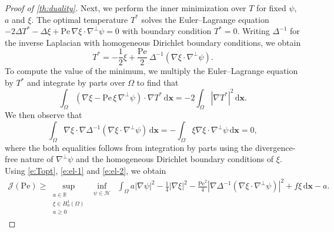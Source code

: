 \documentclass[10pt,a4paper]{amsart}
\newcommand{\Pe}{\mathrm{Pe}}
\newcommand{\R}{\mathbb{R}}
\newcommand{\abs}[1]{\left\vert #1 \right\vert}
\newcommand{\avg}[1]{\int_\Omega #1 \,\dx}
\newcommand{\cal}[1]{\mathcal{#1}}
\newcommand{\dx}{\mathrm{d} \vec{x}}
\newcommand{\invlap}{\Delta^{-1}}
\newcommand{\ocpval}{\mathcal{J}}
\renewcommand{\vec}[1]{\mathbf{#1}}
\begin{document}
\begin{proof}[Proof of \cref{th:duality}]
    Next, we perform the inner minimization over $T$ for fixed $\psi$, $a$ and $\xi$. The optimal temperature $T^*$ solves the Euler--Lagrange equation
    $-2\Delta T^* - \Delta \xi + \Pe \, \nabla \xi \cdot \nabla^\perp \psi = 0$
    with boundary condition $T^* = 0$. Writing $\invlap$ for the inverse Laplacian with homogeneous Dirichlet boundary conditions, we obtain
    \begin{equation}\label{e:Topt}
        T^* = - \frac12\xi + \frac{\Pe}{2}\ \invlap(\nabla \xi \cdot \nabla^\perp \psi).
    \end{equation}
    To compute the value of the minimum, we multiply the Euler--Lagrange equation by $T^*$ and integrate by parts over $\Omega$ to find that
    \begin{equation}\label{e:el-1}
    \avg{ (\nabla\xi - \Pe\,\xi\,\nabla^\perp\psi )\cdot \nabla T^*} = -2 \avg{\abs{\nabla T^*}^2}.
    \end{equation}
    We then observe that
    \begin{equation}\label{e:el-2}
        \avg{\nabla \xi \cdot \nabla \invlap(\nabla \xi \cdot \nabla^\perp \psi)}
        = -\avg{ \xi \nabla \xi \cdot \nabla^\perp \psi}
        = 0,
    \end{equation}
    where the both equalities follows from integration by parts using the divergence-free nature of $\nabla^\perp \psi$ and the homogeneous Dirichlet boundary conditions of $\xi$. Using \cref{e:Topt}, \cref{e:el-1} and \cref{e:el-2}, we obtain
    \begin{align*}
        \ocpval(\Pe)
        \geq 
        \sup_{\substack{a \in \R \\ \xi \in H^1_0(\Omega) \\ a\geq 0}}
        \inf_{\substack{ %
        \psi \in \cal{H}
        }}\; %
        \avg{
            a |\nabla \psi|^2 
            - \frac14 \abs{\nabla \xi}^2 
            - \frac{\Pe^2}{4} \abs{\nabla \invlap(\nabla \xi \cdot \nabla^\perp \psi)}^2 
            + f\xi
        } 
        - a.
    \end{align*}


\end{proof}
\end{document}
